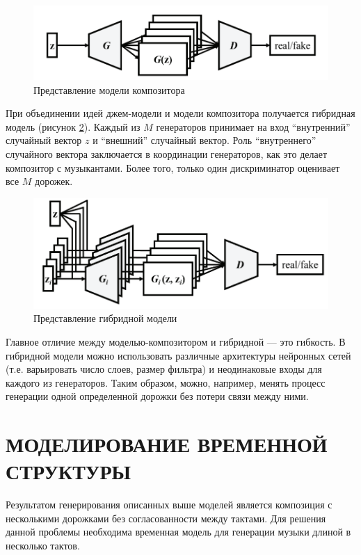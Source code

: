     \begin{figure}[h]
        \centering
        \includegraphics[scale=0.4]{tex/png/composer.png}
        \caption{Представление модели композитора \cite{musegan}}
        \label{fig:composer}
    \end{figure}
    
    При объединении идей джем-модели и модели композитора получается гибридная модель (рисунок \ref{fig:hybrid}). Каждый из $M$ генераторов принимает на вход “внутренний” случайный вектор $z$ и “внешний” случайный вектор. Роль “внутреннего” случайного вектора заключается в координации генераторов, как это делает композитор с музыкантами. Более того, только один дискриминатор оценивает все $M$ дорожек.
    
    \begin{figure}
        \centering
        \includegraphics[scale=0.4]{tex/png/hybrid.png}
        \caption{Представление гибридной модели \cite{musegan}}
        \label{fig:hybrid}
    \end{figure}
    
    Главное отличие между моделью-композитором и гибридной — это гибкость. В гибридной модели можно использовать различные архитектуры нейронных сетей (т.е. варьировать число слоев, размер фильтра) и неодинаковые входы для каждого из генераторов. Таким образом, можно, например, менять процесс генерации одной определенной дорожки без потери связи между ними.

\section{МОДЕЛИРОВАНИЕ ВРЕМЕННОЙ СТРУКТУРЫ}
    Результатом генерирования описанных выше моделей является композиция с несколькими дорожками без согласованности между тактами. Для решения данной проблемы необходима временная модель для генерации музыки длиной в несколько тактов.
    

